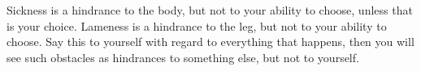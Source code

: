 Sickness is a hindrance to the body,  but not to your ability to choose, unless
that  is your  choice. Lameness  is a  hindrance to  the leg,  but not  to your
ability to choose. Say this to yourself with regard to everything that happens,
then you will  see such obstacles as  hindrances to something else,  but not to
yourself.
